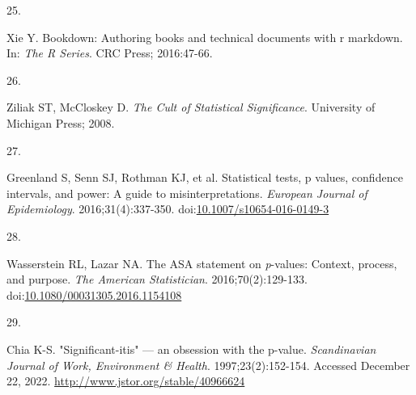 \documentclass[smallextended]{svjour3}       %
\newlength{\cslhangindent}
\newlength{\csllabelwidth}
\newlength{\cslentryspacingunit} %
\newenvironment{CSLReferences}[2] %
 {%
  \setlength{\parindent}{0pt}
  \ifodd #1
  \let\oldpar\par
  \def\par{\hangindent=\cslhangindent\oldpar}
  \fi
  \setlength{\parskip}{#2\cslentryspacingunit}
 }%
 {}
\newcommand{\CSLLeftMargin}[1]{\parbox[t]{\csllabelwidth}{#1}}
\newcommand{\CSLRightInline}[1]{\parbox[t]{\linewidth - \csllabelwidth}{#1}\break}
\begin{document}
\begin{CSLReferences}{0}{0}
\leavevmode{}%
\CSLLeftMargin{25. }%
\CSLRightInline{Xie Y. Bookdown: Authoring books and technical documents
with r markdown. In: \emph{The {R} Series}. CRC Press; 2016:47-66.}

\leavevmode{}%
\CSLLeftMargin{26. }%
\CSLRightInline{Ziliak ST, McCloskey D. \emph{The Cult of Statistical
Significance}. University of Michigan Press; 2008.}

\leavevmode{}%
\CSLLeftMargin{27. }%
\CSLRightInline{Greenland S, Senn SJ, Rothman KJ, et al. Statistical
tests, p values, confidence intervals, and power: A guide to
misinterpretations. \emph{European Journal of Epidemiology}.
2016;31(4):337-350.
doi:\href{https://doi.org/10.1007/s10654-016-0149-3}{10.1007/s10654-016-0149-3}}

\leavevmode{}%
\CSLLeftMargin{28. }%
\CSLRightInline{Wasserstein RL, Lazar NA. The {ASA} statement on
\emph{p}-values: Context, process, and purpose. \emph{The American
Statistician}. 2016;70(2):129-133.
doi:\href{https://doi.org/10.1080/00031305.2016.1154108}{10.1080/00031305.2016.1154108}}

\leavevmode{}%
\CSLLeftMargin{29. }%
\CSLRightInline{Chia K-S. "Significant-itis" --- an obsession with the
p-value. \emph{Scandinavian Journal of Work, Environment \& Health}.
1997;23(2):152-154. Accessed December 22, 2022.
\url{http://www.jstor.org/stable/40966624}}

\end{CSLReferences}




\end{document}
